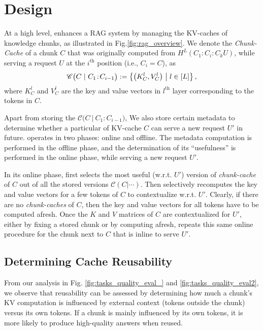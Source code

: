 \section{\sys Design}
\label{sec:overview}

At a high level, \sys enhances a RAG system by managing the KV-caches of knowledge chunks, as illustrated in Fig.\ref{fig:rag_overview}. We denote the \textit{Chunk-Cache} of a chunk $C$ that was originally computed from $H^L(C_1\!:\!C_i\!:\!C_kU)$, while serving a request $U$ at the $i^\text{th}$ position (i.e., $C_i=C$), as
\begin{align}
\small
    \mathscr{C}\big(C \ |\ C_1\!:\!C_{i-1}\big) := \left\{\left(K_C^l, V_C^l\right)\ \middle| \ l\in [L]\right\}, 
\end{align} 
where $K_C^l$ and $V_C^l$ are the key and value vectors in $l^\text{th}$ layer corresponding to the tokens in $C$. 

Apart from storing the $\mathscr{C}\big(C \ |\ C_1\!:\!C_{i-1}\big)$, We also store certain metadata to determine whether a particular of KV-cache $C$ can serve a new request $U'$ in future. \sys operates in two phases: online and offline. 
The metadata computation is performed in the offline phase, and the determination of its ``usefulness'' is performed in the online phase, while serving a new request $U'$. 

In its online phase, \sys first selects the most useful (w.r.t. $U'$) version of \textit{chunk-cache} of $C$ out of all the stored versions $\mathscr{C}(C | \cdots)$. 
Then \sys selectively recomputes the key and value vectors for a few tokens of $C$ to contextualize w.r.t. $U'$. Clearly, if there are no \textit{chunk-caches} of $C$, then the key and value vectors for all tokens have to be computed afresh. Once the $K$ and $V$ matrices of $C$ are contextualized for $U'$, either by fixing a stored chunk or by computing afresh, \sys repeats this same online procedure for the chunk next to $C$ that is inline to serve $U'$.



\subsection{Determining Cache Reusability} 
\label{sec: cache_quality}

From our analysis in Fig. \ref{fig:tasks_quality_eval_} and \ref{fig:tasks_quality_eval2}, we observe that reusability can be assessed by determining how much a chunk’s KV computation is influenced by external context (tokens outside the chunk) versus its own tokens. If a chunk is mainly influenced by its own tokens, it is more likely to produce high-quality answers when reused.


